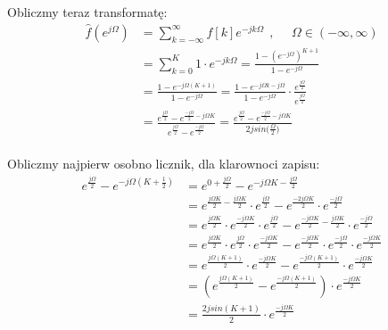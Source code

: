 \documentclass[11pt,a4paper]{article}
\numberwithin{liczba1}{liczba2}
\begin{document}
Obliczmy teraz transformatę:
\begin{equation}
\begin{split}
\hat{f}(e^{j\Omega})
&{} = \sum_{k = -\infty}^{\infty} f[k]e^{-jk\Omega}\ \ , \ \ \ \ \ \ \Omega \in (-\infty,\infty) \\
&{} = \sum_{k = 0}^{K} 1 \cdot e^{-jk\Omega} = \frac{1 - (e^{-j\Omega})^{K+1}}{1 - e^{-j\Omega}} \\
&{} = \frac{1 - e^{-j\Omega(K + 1)}}{1 - e^{-j\Omega}} = \frac{1 - e^{-j\Omega k - j\Omega}}{1 - e^{-j\Omega}} \cdot \frac{e^{\frac{j\Omega}{2}}}{e^{\frac{j\Omega}{2}}}\\
&{} = \frac{e^{\frac{j\Omega}{2}} - e^{\frac{-j\Omega}{2}-j\Omega K}}{e^{\frac{j\Omega}{2}} - e^{\frac{-j\Omega}{2}}} = \frac{e^{\frac{j\Omega}{2}} - e^{\frac{-j\Omega}{2}-j\Omega K}}{2j sin({\frac{\Omega}{2})}}
\end{split}
\end{equation} \\

Obliczmy najpierw osobno licznik, dla klarownoci zapisu:
\begin{equation}
\begin{split}
e^{\frac{j\Omega}{2}} - e^{-j\Omega (K + \frac{1}{2})}
&{} = e^{0 + \frac{j\Omega}{2}} - e^{-j\Omega K - \frac{j\Omega}{2}} \\
&{} = e^{\frac{j\Omega K}{2} - \frac{j\Omega K}{2}} \cdot e^{\frac{j\Omega}{2}} - e^{\frac{-2j\Omega K}{2}} \cdot e^{\frac{-j\Omega}{2}} \\
&{} = e^{\frac{j\Omega K}{2}} \cdot e^{\frac{-j\Omega K}{2}} \cdot e^{\frac{j\Omega}{2}} - e^{\frac{-j\Omega K}{2} - \frac{j\Omega K}{2}} \cdot e^{\frac{-j\Omega}{2}} \\
&{} = e^{\frac{j\Omega K}{2}} \cdot e^{\frac{j\Omega}{2}} \cdot e^{\frac{-j\Omega K}{2}} - e^{\frac{-j\Omega K}{2}} \cdot e^{\frac{-j\Omega}{2}} \cdot e^{\frac{-j\Omega K}{2}} \\
&{} = e^{\frac{j\Omega(K+1)}{2}} \cdot e^{\frac{-j\Omega K}{2}} - e^{\frac{-j\Omega (K+1)}{2}} \cdot e^{\frac{-j\Omega K}{2}} \\
&{} = (e^{\frac{j\Omega(K+1)}{2}} - e^{\frac{-j\Omega(K+1)}{2}}) \cdot e^{\frac{-j\Omega K}{2}} \\
&{} = \frac{2j sin(K+1)}{2} \cdot e^{\frac{-j\Omega K}{2}}
\end{split}
\end{equation} \\
\end{document}
